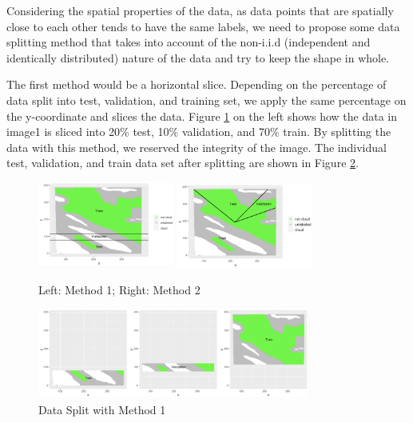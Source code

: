 \documentclass[11pt]{article}
\begin{document}
Considering the spatial properties of the data, as data points that are spatially close to each other tends to have the same labels, we need to propose some data splitting method that takes into account of the non-i.i.d (independent and identically distributed) nature of the data and try to keep the shape in whole. 

The first method would be a horizontal slice. Depending on the percentage of data split into test, validation, and training set, we apply the same percentage on the y-coordinate and slices the data. Figure \ref{fig:2-1-1} on the left shows how the data in image1 is sliced into 20\% test, 10\% validation, and 70\% train. By splitting the data with this method, we reserved the integrity of the image. The individual test, validation, and train data set after splitting are shown in Figure \ref{fig:2-1-2}.

\begin{figure}[h]
\includegraphics[width=0.4\textwidth]{2-1-1.jpeg}
\centering
\includegraphics[width=0.4\textwidth]{2-1-2.jpeg}
\centering
\caption{Left: Method 1; Right: Method 2}
\label{fig:2-1-1}
\centering
\end{figure}

\begin{figure}[h]
\includegraphics[width=0.8\textwidth]{2-1-3.jpeg}
\centering
\caption{Data Split with Method 1}
\label{fig:2-1-2}
\centering
\end{figure}
\end{document}
